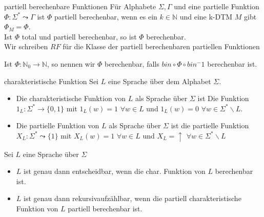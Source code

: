 
\begin{defn}{partiell berechenbare Funktionen}
    Für Alphabete $\Sigma, \Gamma$ und eine partielle Funktion $\Phi : \Sigma^* \leadsto
    \Gamma$ ist $\Phi$ partiell berechenbar, wenn es ein $k \in \mathbb{N}$ und eine k-DTM $M$ gibt $\Phi_M = \Phi$. \\

    Ist $\Phi$ total und partiell berechenbar, so ist $\Phi$ berechenbar. \\

    Wir schreiben $RF$ für die Klasse der partiell berechenbaren partiellen Funktionen

    Ist $\Phi : \mathbb{N}_0 \rightarrow \mathbb{N}$, so nennen wir $\Phi$ berechenbar,
    falls $bin \circ \Phi \circ bin^-1$ berechenbar ist.
\end{defn}

\begin{defn}{charakteristische Funktion}
    Sei $L$ eine Sprache über dem Alphabet $\Sigma$. \\
    \begin{itemize}
        \item Die charakteristische Funktion von $L$ als Sprache über $\Sigma$ ist Die
              Funktion $1_L : \Sigma^* \rightarrow \{0,1\}$ mit $1_L(w) = 1$ $\forall w \in L$
              und $1_L(w) = 0$ $\forall w \in \Sigma^* \backslash L$.
        \item Die partielle Funktion von $L$ als Sprache über $\Sigma$ ist die partielle Funktion
              $X_L : \Sigma^* \leadsto \{1\}$ mit $X_L(w) = 1$ $\forall w \in L$ und $X_L = \uparrow$ $\forall w \in \Sigma^* \backslash L$
    \end{itemize}
\end{defn}

\begin{bem}
    Sei $L$ eine Sprache über $\Sigma$\\
    \begin{itemize}
        \item $L$ ist genau dann entscheidbar, wenn die char. Funktion von $L$ berechenbar ist.
        \item $L$ ist genau dann rekursivaufzählbar, wenn die partiell charakteristische Funktion von $L$
              partiell berechenbar ist.
    \end{itemize}
\end{bem}

